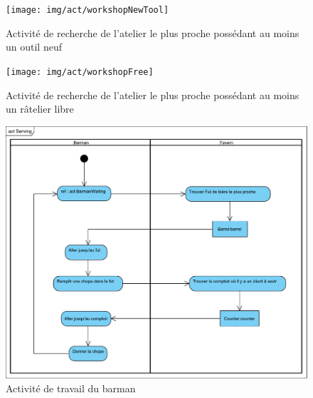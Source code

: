 \documentclass[a4paper]{report}
\begin{document}
\begin{figure}[H]
    \center
    \texttt{[image: img/act/workshopNewTool]}
    \caption{Activité de recherche de l'atelier le plus proche possédant au moins un outil neuf}
		\label{}
\end{figure}


\begin{figure}[H]
    \center
    \texttt{[image: img/act/workshopFree]}
    \caption{Activité de recherche de l'atelier le plus proche possédant au moins un râtelier libre}
		\label{}
\end{figure}


\begin{figure}[H]
    \center
    \includegraphics[width=15cm]{img/act/Serving}
    \caption{Activité de travail du barman}
		\label{}
\end{figure}
\end{document}
